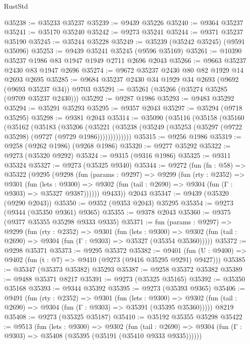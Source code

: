 \begin{lexlean}{RustStd}
\begin{coremodule}
{\begin{coremodule}
{{{{{{{{{{{{{{{{{{{{{{{{{{{{{{{{{{{{{{{{{{{{{{{{{{{{{{{@35238 := @35233 @35237
@35239 := @9439 @35226
@35240 := @9364 @35237
@35241 := @35170 @35240
@35242 := @9273 @35241
@35244 := @9371 @35237 @35190
@35245 := @35244 @35228
@35249 := @35239 (@35242 @35245) (@9591 @35096)
@35253 := @9439 @35241 @35245 (@9596 @35169)
@35261 := @10390 @35237 @1986 @83 @1947 @1949 @2711 @2696 @2043
@35266 := @9663 @35237 @2430 @83 @1947 @2696
@35274 := @9672 @35237 @2430 @80 @82 @1929 @14 @2693 @2695
@35285 := @9684 @35237 @2430 @34 @1929 @34 @2693 (@9692 (@9693 @35237 @34)) @9703
@35291 := @35261 (@35266 (@35274 @35285 (@9709 @35237 @2430)))
@35292 := @9287 @1986
@35293 := @9483 @35292
@35294 := @35291 @35293
@35295 := @9357 @2043
@35297 := @35294 (@9718 @35295)
@35298 := @9381 @2043
@35314 := @35090
    (@35116
      (@35158
        (@35160
          (@35162
            (@35183
              (@35206
                (@35221
                  (@35238 (@35249 (@35253 (@35297 (@9722 @35298) (@9727 (@9729 @1986)))))))))))))
@35315 := @9256 @1986
@35319 := @9258 (@9262 @1986) (@9268 @1986)
@35320 := @9277 @35292
@35322 := @9273 (@35320 @9292)
@35324 := @9315 (@9316 @1986)
@35325 := @9311 @35324
@35327 := @9273 (@35325 @9340)
@35344 := @9272
    (fun (fn : @58) =>
    @35322
      (@9295
        (@9298
          (fun (params : @9297) =>
          @9299
            (fun (rty : @2352) =>
            @9301
              (fun (lets : @9300) =>
              @9302 (fun (tail : @2690) => @9304 (fun (Γ : @9303) => @35327 @9387))))))
        @9433))
    @2043
@35347 := @9439 (@35320 (@9290 @2043))
@35350 := @9352 (@9353 @2043) @35295
@35354 := @9273 (@9344 (@35350 @9361) @9365)
@35355 := @9378 @2043
@35360 := @9375 (@9377 @35355 @35298 @9333 @9335)
@35371 := fun (params : @9297) =>
  @9299
    (fun (rty : @2352) =>
    @9301
      (fun (lets : @9300) =>
      @9302 (fun (tail : @2690) => @9304 (fun (Γ : @9303) => @35327 (@35354 @35360)))))
@35372 := @9298 @35371
@35373 := @9295 @35372
@35382 := @9401
    (fun (U : @9400) => @9402 (fun (t : @7) => @9410 (@9273 (@9416 @35295 @9291) @9427)))
@35385 := @35347 (@35373 @35382) @35293
@35387 := @9258 @35372 @35382
@35389 := @9488 @35371 @8217
@35391 := @9273 (@35325 @35165)
@35392 := @35350 @35168
@35393 := @9344 @35392
@35395 := @9273 (@35393 @9365)
@35406 := @9491
    (fun (rty : @2352) =>
    @9301
      (fun (lets : @9300) =>
      @9302 (fun (tail : @2690) => @9304 (fun (Γ : @9303) => @35391 (@35395 @35360)))))
    @8219
@35408 := @9273 (@35325 @35187)
@35410 := @35192 @35355 @35298
@35422 := @9513
    (fun (lets : @9300) =>
    @9302
      (fun (tail : @2690) =>
      @9304 (fun (Γ : @9303) => @35408 (@35395 (@35191 (@35410 @9333 @9335))))))
}}}}}}}}}}}}}}}}}}}}}}}}}}}}}}}}}}}}}}}}}}}}}}}}}}}}}}}
\end{coremodule}}
\end{coremodule}
\end{lexlean}
